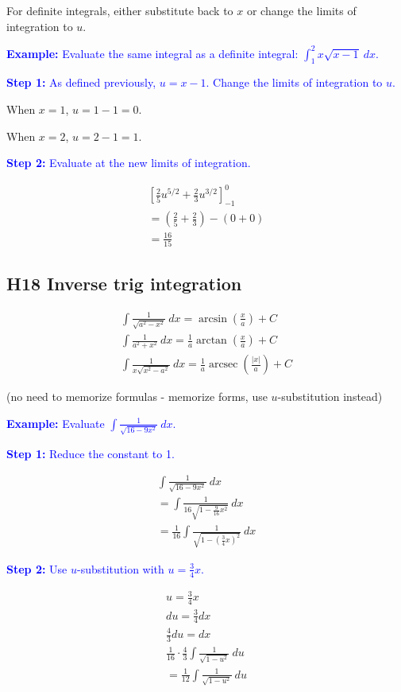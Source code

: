 \documentclass[letterpaper, 12pt]{article}
\DeclareMathOperator{\arcsec}{arcsec}
\newcommand{\example}[1]{\textcolor{blue}{\textbf{Example:} #1}}
\newcommand{\step}[2]{\textcolor{blue}{\textbf{Step #1:} #2}}
\begin{document}
For definite integrals, either substitute back to $x$ or change the limits of integration to $u$.

\example{Evaluate the same integral as a definite integral: $\displaystyle \int_1^2 x\sqrt{x-1} \: dx$.}

\step{1}{As defined previously, $u = x - 1$. Change the limits of integration to $u$.}

When $x = 1$, $u = 1 - 1 = 0$.

When $x = 2$, $u = 2 - 1 = 1$.

\step{2}{Evaluate at the new limits of integration.}

\begin{gather*}
\left[ \frac{2}{5} u^{5/2} + \frac{2}{3} u^{3/2} \right]_{-1}^{0} \\
= \left(\frac{2}{5}+\frac{2}{3}\right) - (0+0) \\
= \boxed{\frac{16}{15}}
\end{gather*}

\subsection*{H18 Inverse trig integration}

\begin{gather*}
\int \frac{1}{\sqrt{a^2 - x^2}} \: dx = \arcsin \left( \frac{x}{a} \right) + C \\
\int \frac{1}{a^2 + x^2} \: dx = \frac{1}{a} \arctan \left( \frac{x}{a} \right) + C \\
\int \frac{1}{x \sqrt{x^2 - a^2}} \: dx = \frac{1}{a} \arcsec \left( \frac{|x|}{a} \right) + C
\end{gather*}

(no need to memorize formulas - memorize forms, use $u$-substitution instead)

\example{Evaluate $\displaystyle \int \frac{1}{\sqrt{16 - 9x^2}} \: dx$.}

\step{1}{Reduce the constant to 1.}

\begin{gather*}
\int \frac{1}{\sqrt{16 - 9x^2}} \: dx \\
= \int \frac{1}{16\sqrt{1 - \frac{9}{16}x^2}} \: dx \\
= \frac{1}{16} \int \frac{1}{\sqrt{1 - \left(\frac{3}{4}x\right)^2}} \: dx
\end{gather*}

\step{2}{Use $u$-substitution with $u = \frac{3}{4}x$.}

\begin{gather*}
u = \frac{3}{4}x \\
du = \frac{3}{4} dx \\
\frac{4}{3} du = dx \\
\frac{1}{16} \cdot \frac{4}{3} \int \frac{1}{\sqrt{1 - u^2}} \: du \\
= \frac{1}{12} \int \frac{1}{\sqrt{1 - u^2}} \: du
\end{gather*}
\end{document}

